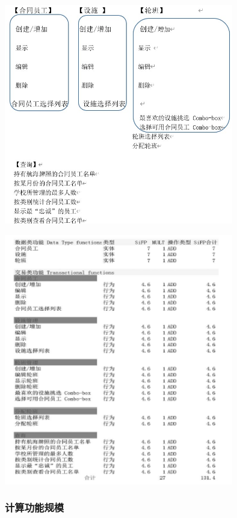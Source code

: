 \includegraphics[width=10cm]{Ex1SoluScreenshot_2022-04-05_115926.jpg}


\includegraphics[width=10cm]{微信截图_20230324091110.png}

\hypertarget{ux8ba1ux7b97ux529fux80fdux89c4ux6a21}{%
\subsubsection{计算功能规模}\label{ux8ba1ux7b97ux529fux80fdux89c4ux6a21}}

\begin{description}
\item[]
\end{description}

